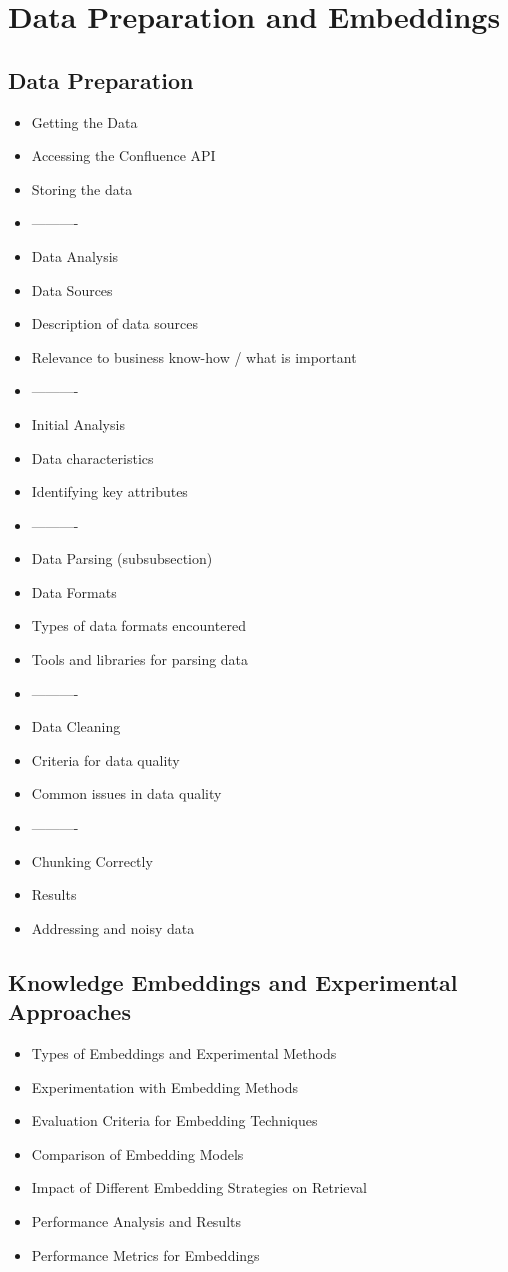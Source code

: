 \chapter{Data Preparation and Embeddings}
\section{Data Preparation}
\begin{itemize}
    \item Getting the Data
    \item Accessing the Confluence API
    \item Storing the data
    \item ----------
    \item Data Analysis
    \item Data Sources
    \item Description of data sources
    \item Relevance to business know-how / what is important
    \item ----------
    \item Initial Analysis
    \item Data characteristics
    \item Identifying key attributes
    \item ----------
    \item Data Parsing (subsubsection)
    \item Data Formats
    \item Types of data formats encountered
    \item Tools and libraries for parsing data
    \item ----------
    \item Data Cleaning
    \item Criteria for data quality
    \item Common issues in data quality
    \item ----------
    \item Chunking Correctly
    \item Results
    \item Addressing and noisy data
\end{itemize}

\section{Knowledge Embeddings and Experimental Approaches}
\begin{itemize}
    \item Types of Embeddings and Experimental Methods
    \item Experimentation with Embedding Methods
    \item Evaluation Criteria for Embedding Techniques
    \item Comparison of Embedding Models
    \item Impact of Different Embedding Strategies on Retrieval
    \item Performance Analysis and Results
    \item Performance Metrics for Embeddings
\end{itemize}